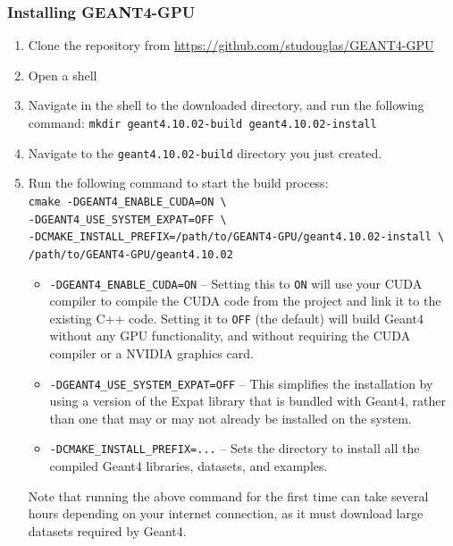 \documentclass[12pt]{article}
\begin{document}
\subsubsection{Installing GEANT4-GPU}
\begin{enumerate}
\item Clone the repository from \url{https://github.com/studouglas/GEANT4-GPU}
\item Open a shell
\item \label{StepMkdir} Navigate in the shell to the downloaded directory, and run the following command: \texttt{mkdir geant4.10.02-build geant4.10.02-install}
\item Navigate to the \texttt{geant4.10.02-build} directory you just created.
\item \label{StepCMake} Run the following command to start the build process:\\
\texttt{cmake -DGEANT4\_ENABLE\_CUDA=ON \textbackslash\\
 -DGEANT4\_USE\_SYSTEM\_EXPAT=OFF \textbackslash\\
 -DCMAKE\_INSTALL\_PREFIX=/path/to/GEANT4-GPU/geant4.10.02-install \textbackslash\\
 /path/to/GEANT4-GPU/geant4.10.02}
\begin{itemize}
\item \texttt{-DGEANT4\_ENABLE\_CUDA=ON} -- Setting this to \texttt{ON} will use your CUDA compiler to compile the CUDA code from the project and link it to the existing C++ code. Setting it to \texttt{OFF} (the default) will build Geant4 without any GPU functionality, and without requiring the CUDA compiler or a NVIDIA graphics card.
\item \texttt{-DGEANT4\_USE\_SYSTEM\_EXPAT=OFF} -- This simplifies the installation by using a version of the Expat library that is bundled with Geant4, rather than one that may or may not already be installed on the system. 
\item \texttt{-DCMAKE\_INSTALL\_PREFIX=...} -- Sets the directory to install all the compiled Geant4 libraries, datasets, and examples.
\end{itemize}
Note that running the above command for the first time can take several hours depending on your internet connection, as it must download large datasets required by Geant4.\\


\end{enumerate}
\end{document}
